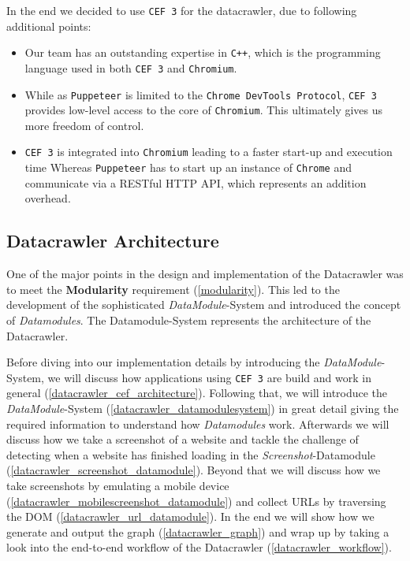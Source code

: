 In the end we decided to use \texttt{CEF 3} for the datacrawler, due to following additional points:
\begin{itemize}
\item Our team has an outstanding expertise in \texttt{C++}, which is the programming language used in both \texttt{CEF 3} and \texttt{Chromium}.
\item While as \texttt{Puppeteer} is limited to the \texttt{Chrome DevTools Protocol}, \texttt{CEF 3} provides low-level access to the core of \texttt{Chromium}. This ultimately gives us more freedom of control.
\item \texttt{CEF 3} is integrated into \texttt{Chromium} leading to a faster start-up and execution time Whereas \texttt{Puppeteer} has to start up an instance of \texttt{Chrome} and communicate via a RESTful HTTP API, which represents an addition overhead.
\end{itemize}


\subsection{Datacrawler Architecture}
\label{datacrawler_architecture}
One of the major points in the design and implementation of the Datacrawler was to meet the \textbf{Modularity} requirement (\ref{modularity}). This led to the development of the sophisticated \textit{DataModule}-System and introduced the concept of \textit{Datamodules}. The Datamodule-System represents the architecture of the Datacrawler. 

Before diving into our implementation details by introducing the \textit{DataModule}-System, we will discuss how applications using \texttt{CEF 3} are build and work in general (\ref{datacrawler_cef_architecture}). Following that, we will introduce the \textit{DataModule}-System (\ref{datacrawler_datamodulesystem}) in great detail giving the required information to understand how \textit{Datamodules} work. Afterwards we will discuss how we take a screenshot of a website and tackle the challenge of detecting when a website has finished loading in the \textit{Screenshot}-Datamodule (\ref{datacrawler_screenshot_datamodule}). Beyond that we will discuss how we take screenshots by emulating a mobile device (\ref{datacrawler_mobilescreenshot_datamodule}) and collect URLs by traversing the DOM (\ref{datacrawler_url_datamodule}). In the end we will show how we generate and output the graph (\ref{datacrawler_graph}) and wrap up by taking a look into the end-to-end workflow of the Datacrawler (\ref{datacrawler_workflow}). 

